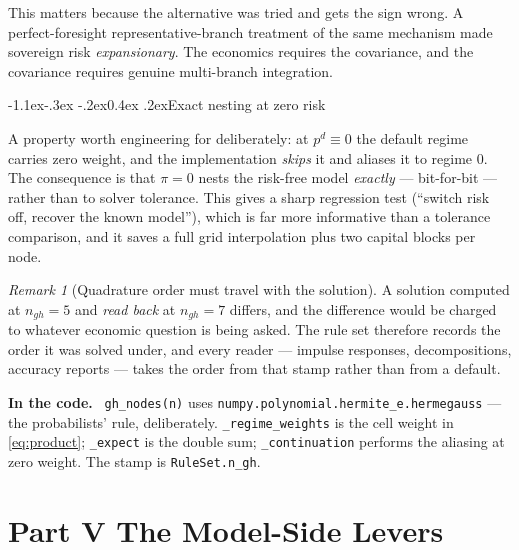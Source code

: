 \documentclass[10pt,a4paper]{article}
\makeatletter
\theoremstyle{definition}
\theoremstyle{plain}
\theoremstyle{remark}
\newtheorem{rem}[defn]{Remark}
\newenvironment{codehint}%
  {\par\vspace{2pt}\begin{framed}\noindent\small\textcolor{codeblue}{\textbf{In the code.}}\ }%
  {\end{framed}\vspace{2pt}}
\newcommand{\code}[1]{\texttt{#1}}
\renewcommand\subsection{\@startsection{subsection}{2}{\z@}%
  {-1.1ex\@plus -.3ex \@minus -.2ex}{0.4ex \@plus .2ex}{\normalfont\normalsize\bfseries}}
\makeatother
\begin{document}
This matters because the alternative was tried and gets the sign wrong. A perfect-foresight
representative-branch treatment of the same mechanism made sovereign risk \emph{expansionary}.
The economics requires the covariance, and the covariance requires genuine multi-branch
integration.

\subsection{Exact nesting at zero risk}

A property worth engineering for deliberately: at $p^d\equiv0$ the default regime carries zero
weight, and the implementation \emph{skips} it and aliases it to regime $0$. The consequence is
that $\pi=0$ nests the risk-free model \emph{exactly} --- bit-for-bit --- rather than to solver
tolerance. This gives a sharp regression test (``switch risk off, recover the known model''),
which is far more informative than a tolerance comparison, and it saves a full grid
interpolation plus two capital blocks per node.

\begin{rem}[Quadrature order must travel with the solution]
A solution computed at $n_{gh}=5$ and \emph{read back} at $n_{gh}=7$ differs, and the
difference would be charged to whatever economic question is being asked. The rule set
therefore records the order it was solved under, and every reader --- impulse responses,
decompositions, accuracy reports --- takes the order from that stamp rather than from a
default.
\end{rem}

\begin{codehint}
\code{gh\_nodes(n)} uses \code{numpy.polynomial.hermite\_e.hermegauss} --- the probabilists'
rule, deliberately. \code{\_regime\_weights} is the cell weight in \eqref{eq:product};
\code{\_expect} is the double sum; \code{\_continuation} performs the aliasing at zero weight.
The stamp is \code{RuleSet.n\_gh}.
\end{codehint}

\vspace{-4pt}\part*{Part V \quad The Model-Side Levers}
\end{document}
